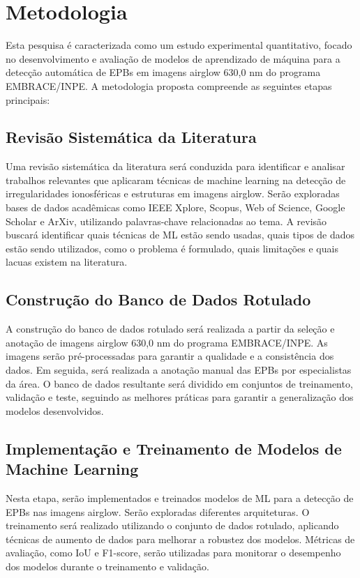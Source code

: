 \chapter{Metodologia}

Esta pesquisa é caracterizada como um estudo experimental quantitativo, focado no desenvolvimento e avaliação de modelos de aprendizado de máquina para a detecção automática de EPBs em imagens airglow 630,0 nm do programa EMBRACE/INPE. A metodologia proposta compreende as seguintes etapas principais:

\section{Revisão Sistemática da Literatura}

Uma revisão sistemática da literatura será conduzida para identificar e analisar trabalhos relevantes que aplicaram técnicas de machine learning na detecção de irregularidades ionosféricas e estruturas em imagens airglow. Serão exploradas bases de dados acadêmicas como IEEE Xplore, Scopus, Web of Science, Google Scholar e ArXiv, utilizando palavras-chave relacionadas ao tema. A revisão buscará identificar quais técnicas de ML estão sendo usadas, quais tipos de dados estão sendo utilizados, como o problema é formulado, quais limitações e quais lacuas existem na literatura.

\section{Construção do Banco de Dados Rotulado}

A construção do banco de dados rotulado será realizada a partir da seleção e anotação de imagens airglow 630,0 nm do programa EMBRACE/INPE. As imagens serão pré-processadas para garantir a qualidade e a consistência dos dados. Em seguida, será realizada a anotação manual das EPBs por especialistas da área. O banco de dados resultante será dividido em conjuntos de treinamento, validação e teste, seguindo as melhores práticas para garantir a generalização dos modelos desenvolvidos.

\section{Implementação e Treinamento de Modelos de Machine Learning}

Nesta etapa, serão implementados e treinados modelos de ML para a detecção de EPBs nas imagens airglow. Serão exploradas diferentes arquiteturas. O treinamento será realizado utilizando o conjunto de dados rotulado, aplicando técnicas de aumento de dados para melhorar a robustez dos modelos. Métricas de avaliação, como IoU e F1-score, serão utilizadas para monitorar o desempenho dos modelos durante o treinamento e validação.